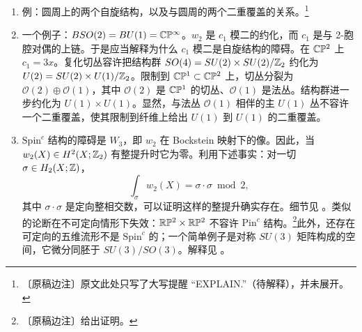 \begin{enumerate}[label=\arabic*., leftmargin=2.1em]
\item 例：圆周上的两个自旋结构，以及与圆周的两个二重覆盖的关系。\footnote{〔原稿边注〕原文此处只写了大写提醒 “EXPLAIN.”（待解释），并未展开。}

\item 一个例子：$BSO(2)=BU(1)=\mathbb{C}\mathbb{P}^{\infty}$。$w_{2}$ 是 $c_{1}$ 模二的约化，而 $c_{1}$ 是与 2-胞腔对偶的上链。于是应当解释为什么 $c_{1}$ 模二是自旋结构的障碍。在 $\mathbb{C}\mathbb{P}^{2}$ 上 $c_{1}=3x$。复化切丛容许把结构群 $SO(4)=SU(2)\times SU(2)/\mathbb{Z}_{2}$ 约化为 $U(2)=SU(2)\times U(1)/\mathbb{Z}_{2}$。限制到 $\mathbb{C}\mathbb{P}^{1}\subset\mathbb{C}\mathbb{P}^{2}$ 上，切丛分裂为 $\mathcal{O}(2)\oplus\mathcal{O}(1)$，其中 $\mathcal{O}(2)$ 是 $\mathbb{C}\mathbb{P}^{1}$ 的切丛、$\mathcal{O}(1)$ 是法丛。结构群进一步约化为 $U(1)\times U(1)$。显然，与法丛 $\mathcal{O}(1)$ 相伴的主 $U(1)$ 丛不容许一个二重覆盖，使其限制到纤维上给出 $U(1)$ 到 $U(1)$ 的二重覆盖。

\item $\mathrm{Spin}^{c}$ 结构的障碍是 $W_{3}$，即 $w_{2}$ 在 Bockstein 映射下的像。因此，当 $w_{2}(X)\in H^{2}(X;\mathbb{Z}_{2})$ 有整提升时它为零。利用下述事实：对一切 $\sigma\in H_{2}(X;\mathbb{Z})$，
\begin{equation}
\int_{\sigma}w_{2}(X)=\sigma\cdot\sigma\bmod2,
\tag{A.13}
\end{equation}
其中 $\sigma\cdot\sigma$ 是定向整相交数，可以证明这样的整提升确实存在。细节见 \cite{ref52}。类似的论断在不可定向情形下失效：$\mathbb{R}\mathbb{P}^{2}\times\mathbb{R}\mathbb{P}^{2}$ 不容许 $\mathrm{Pin}^{c}$ 结构。\footnote{〔原稿边注〕给出证明。}此外，还存在可定向的五维流形不是 $\mathrm{Spin}^{c}$ 的；一个简单例子是对称 $SU(3)$ 矩阵构成的空间，它微分同胚于 $SU(3)/SO(3)$。解释见 \cite{ref28}。
\end{enumerate}



